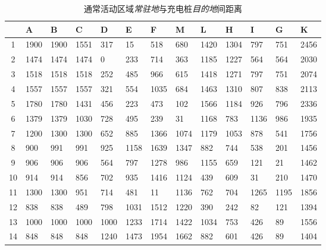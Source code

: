 \begin{table}[H]\small
	\centering
	\caption{通常活动区域\textit{常驻地}与充电桩\textit{目的地}间距离}
	\begin{tabular}{c|p{0.60cm}<{\centering}|p{0.6cm}<{\centering}|p{0.6cm}<{\centering}|p{0.6cm}<{\centering}|p{0.6cm}<{\centering}|p{0.6cm}<{\centering}|p{0.6cm}<{\centering}|p{0.6cm}<{\centering}|p{0.6cm}<{\centering}|p{0.6cm}<{\centering}|p{0.6cm}<{\centering}|p{0.54cm}<{\centering}}
		\toprule[2pt]  %
		\diagbox{\footnotesize {目的地$j$}}{\footnotesize {距离（$m$）}}{\footnotesize {常驻地$i$}} &  A & B & C & D & E & F & M & L & H & I & G & K \\
		\midrule[1.75pt]  %
		1 & 1900 & 1900 & 1551 & 317 & 15 & 518 & 680 & 1420 & 1304 & 797 & 751 & 2456 \\ 
        2 & 1474 & 1474 & 1474 & 0 & 233 & 714 & 363 & 1185 & 1227 & 564 & 564 & 2030 \\ 
        3 & 1518 & 1518 & 1518 & 252 & 485 & 966 & 615 & 1418 & 1271 & 797 & 751 & 2074 \\ 
        4 & 1557 & 1557 & 1557 & 321 & 554 & 1035 & 684 & 1463 & 1310 & 807 & 838 & 2113 \\ 
        5 & 1780 & 1780 & 1431 & 456 & 223 & 473 & 102 & 1566 & 1184 & 926 & 796 & 2336 \\ 
        6 & 1379 & 1379 & 1030 & 728 & 495 & 239 & 31 & 1168 & 783 & 1136 & 986 & 1935 \\ 
        7 & 1200 & 1300 & 1300 & 652 & 885 & 1366 & 1074 & 1179 & 1053 & 878 & 541 & 1756 \\ 
        8 & 900 & 991 & 991 & 925 & 1158 & 1639 & 1347 & 882 & 744 & 538 & 201 & 1456 \\ 
        9 & 906 & 906 & 906 & 564 & 797 & 1278 & 986 & 1155 & 659 & 121 & 21 & 1462 \\ 
        10 & 914 & 914 & 856 & 702 & 935 & 1416 & 1124 & 439 & 609 & 31 & 210 & 1470 \\ 
        11 & 1300 & 1300 & 951 & 714 & 481 & 11 & 1136 & 762 & 704 & 1265 & 1195 & 1856 \\ 
        12 & 838 & 838 & 489 & 798 & 1031 & 1512 & 1220 & 390 & 242 & 82 & 121 & 1394 \\ 
        13 & 1000 & 1000 & 1000 & 1000 & 1233 & 1714 & 1422 & 1034 & 753 & 426 & 89 & 1556 \\ 
        14 & 848 & 848 & 848 & 1240 & 1473 & 1954 & 1662 & 882 & 601 & 426 & 89 & 1404 \\ 

\end{tabular}
\end{table}
